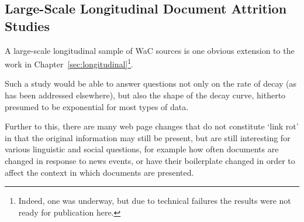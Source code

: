 




%





\subsection{Large-Scale Longitudinal Document Attrition Studies}
A large-scale longitudinal sample of WaC sources is one obvious extension to the work in Chapter~\ref{sec:longitudinal}\footnote{Indeed, one was underway, but due to technical failures the results were not ready for publication here.}.

Such a study would be able to answer questions not only on the rate of decay (as has been addressed elsewhere), but also the shape of the decay curve, hitherto presumed to be exponential for most types of data.

Further to this, there are many web page changes that do not constitute `link rot' in that the original information may still be present, but are still interesting for various linguistic and social questions, for example how often documents are changed in response to news events, or have their boilerplate changed in order to affect the context in which documents are presented.

